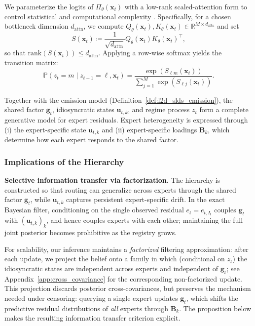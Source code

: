 We parameterize the logits of \(\Pi_\theta(\mathbf{x}_t)\) with a low-rank scaled-attention form to
control statistical and computational complexity \citep{allyouneed, kossen2021self, mehta2022neural}.
Specifically, for a chosen bottleneck dimension \(d_{\mathrm{attn}}\), we compute
\(Q_\theta(\mathbf{x}_t),K_\theta(\mathbf{x}_t)\in\mathbb{R}^{M\times d_{\mathrm{attn}}}\) and set
\[
S(\mathbf{x}_t)\coloneqq \frac{1}{\sqrt{d_{\mathrm{attn}}}}Q_\theta(\mathbf{x}_t)K_\theta(\mathbf{x}_t)^\top,
\]
so that \(\mathrm{rank}(S(\mathbf{x}_t))\le d_{\mathrm{attn}}\). Applying a row-wise softmax yields the
transition matrix:
\begin{equation}
\label{eq:context_transitions}
\mathbb{P}(z_t=m \mid z_{t-1}=\ell,\mathbf{x}_t)
=
\frac{\exp(S_{\ell m}(\mathbf{x}_t))}{\sum_{j=1}^M \exp(S_{\ell j}(\mathbf{x}_t))}.
\end{equation}

Together with the emission model (Definition~\ref{def:l2d_slds_emission}), the shared factor
\(\mathbf{g}_t\), idiosyncratic states \(\mathbf{u}_{t,k}\), and regime process \(z_t\) form a
complete generative model for expert residuals. Expert heterogeneity is expressed through (i) the
expert-specific state \(\mathbf{u}_{t,k}\) and (ii) expert-specific loadings \(\mathbf{B}_k\), which
determine how each expert responds to the shared factor.

\subsubsection{Implications of the Hierarchy}

\textbf{Selective information transfer via factorization.}
The hierarchy is constructed so that routing can generalize across experts through the shared factor
\(\mathbf{g}_t\), while \(\mathbf{u}_{t,k}\) captures persistent expert-specific drift. In the exact
Bayesian filter, conditioning on the single observed residual \(e_t=e_{t,I_t}\) couples
\(\mathbf{g}_t\) with \((\mathbf{u}_{t,k})_k\), and hence couples experts with each other; maintaining
the full joint posterior becomes prohibitive as the registry grows.

For scalability, our inference maintains a \emph{factorized} filtering approximation: after each
update, we project the belief onto a family in which (conditional on \(z_t\)) the idiosyncratic
states are independent across experts and independent of \(\mathbf{g}_t\); see
Appendix~\ref{app:cross_covariance} for the corresponding non-factorized update. This projection
discards posterior cross-covariances, but preserves the mechanism needed under censoring: querying a
single expert updates \(\mathbf{g}_t\), which shifts the predictive residual distributions of \emph{all}
experts through \(\mathbf{B}_k\). The proposition below makes the resulting information transfer
criterion explicit.

